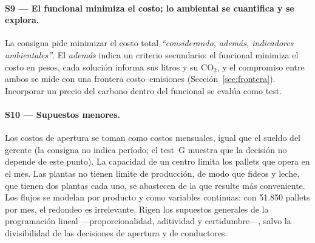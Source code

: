 \documentclass[10pt,a4paper]{article}
\newcommand{\cita}[1]{\emph{``#1''}}
\begin{document}
\paragraph{S9 — El funcional minimiza el costo; lo ambiental se cuantifica y
se explora.} La consigna pide minimizar el costo total \cita{considerando,
además, indicadores ambientales}. El \emph{además} indica un criterio
secundario: el funcional minimiza el costo en pesos, cada solución informa sus
litros y su CO$_2$, y el compromiso entre ambos se mide con una frontera
costo–emisiones (Sección~\ref{sec:frontera}). Incorporar un precio del carbono
dentro del funcional se evalúa como test.

\paragraph{S10 — Supuestos menores.} Los costos de apertura se toman como
costos mensuales, igual que el sueldo del gerente (la consigna no indica
período; el test~G muestra que la decisión no depende de este punto). La
capacidad de un centro limita los pallets que opera en el mes. Las plantas no
tienen límite de producción, de modo que fideos y leche, que tienen dos plantas
cada uno, se abastecen de la que resulte más conveniente. Los flujos se
modelan por producto y como variables continuas: con 51.850 pallets por mes, el
redondeo es irrelevante. Rigen los supuestos generales de la programación
lineal —proporcionalidad, aditividad y certidumbre—, salvo la divisibilidad de
las decisiones de apertura y de conductores.
\end{document}
